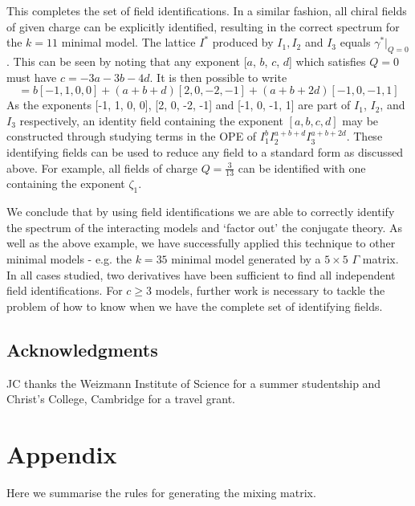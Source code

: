 \documentclass[a4paper,a4paper]{article}
\begin{document}
This completes the set of field identifications. In a similar fashion, all chiral fields of given charge can be explicitly identified, resulting in the 
correct spectrum for the $k=11$ minimal model.
The lattice $I^{*}$ produced by $I_1, I_2$ and $I_3$ equals $\gamma^{*}|_{Q=0}$. This can be seen by noting that any
exponent [$a$, $b$, $c$, $d$] which satisfies $Q=0$ must have $c= -3a -3b - 4d$. It is then possible to write
\begin{displaymath}
[a,b,c,d] = b[-1,1,0,0] + (a+b+d)[2,0,-2,-1] + (a+b+2d)[-1,0,-1,1]
\end{displaymath}
As the exponents [-1, 1, 0, 0], [2, 0, -2, -1] and [-1, 0, -1, 1] are part of $I_1$, $I_2$, and $I_3$ respectively, 
an identity field containing the exponent $[a, b, c, d]$  may be constructed through studying terms in the OPE of 
$I_1^b I_2^{a+b+d} I_3^{a+b+2d}$. These identifying fields can be used to reduce any field to a standard form as discussed above. For example, all fields
of charge $Q=\frac{3}{13}$ can be identified with one containing the exponent $\zeta_1$.

We conclude that by using field identifications we are able to correctly identify the spectrum of the interacting models and `factor out' 
the conjugate theory. As well as the above example, we have successfully applied this technique to other minimal models - e.g. 
the $k=35$ minimal model generated by a $5\times5$ $\Gamma$ matrix. In all cases studied, two derivatives have been sufficient to find all independent field
identifications. For $c\ge3$ models, further work is necessary to tackle the problem of how to know when we have the complete set of identifying fields.

\subsection*{Acknowledgments}

JC thanks the Weizmann Institute of Science for a summer studentship and Christ's College, Cambridge for a travel grant.

\appendix
\section*{Appendix}

Here we summarise the rules for generating the mixing matrix. 
\newline
\end{document}

